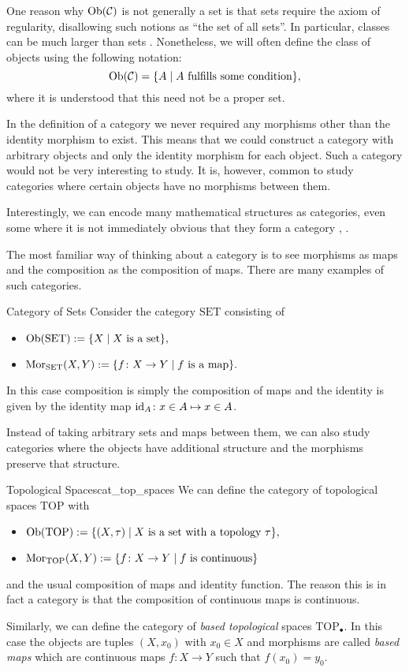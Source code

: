 One reason why $\mathrm {Ob}(\mathcal{C})$ is not generally a set is that sets require the axiom of regularity, 
disallowing such notions as ``the set of all sets''. In particular, classes can be much larger than sets \cite[p.~1]{Roman2017}.
Nonetheless, we will often define the class of objects using the following notation:
$$
\mathrm {Ob}(\mathcal{C}) = \{A \mid \text{$A$ fulfills some condition}\},
$$
where it is understood that this need not be a proper set.

In the definition of a category we never required any morphisms other than the identity morphism to exist.
This means that we could construct a category with arbitrary objects and only the identity morphism for each object. 
Such a category would not be very interesting to study.
It is, however, common to study categories where certain objects have no morphisms between them.

Interestingly, we can encode many mathematical structures as categories, even some where it is not immediately obvious that they form a category \cite[Chap.~1~Ex.~1-7]{Roman2017}, \cite[Sec.~1.1]{Leinster2014-dc}.

The most familiar way of thinking about a category is to see morphisms as maps and the composition as the composition of maps. There are many examples of such categories.

\begin{example}{Category of Sets}{}
Consider the category $\mathrm{SET}$ consisting of
\begin{itemize}
    \item $\mathrm {Ob}(\mathrm{SET}) := \{X \mid \text{$X$ is a set}\},$
    \item $\mathrm {Mor}_{\mathrm{SET}}(X,Y) := \{f\colon X \to Y \mid \text{$f$ is a map}\}.$
\end{itemize}
In this case composition is simply the composition of maps and the identity is given by the identity map $\mathrm{id}_A\colon x \in A \mapsto x \in A$.
\end{example}

Instead of taking arbitrary sets and maps between them, we can also study categories where the objects have additional structure and the morphisms preserve that structure.

\begin{example}{Topological Spaces}{cat_top_spaces}
We can define the category of topological spaces $\mathrm{TOP}$ with
\begin{itemize}
    \item $\mathrm {Ob}(\mathrm{TOP}) := \{(X,\tau) \mid \text{$X$ is a set with a topology $\tau$}\},$
    \item $\mathrm {Mor}_{\mathrm{TOP}}(X,Y) := \{f\colon X \to Y \mid \text{$f$ is continuous}\}$
\end{itemize}
and the usual composition of maps and identity function. The reason this is in fact a category is that the composition of continuous maps is continuous.
\medskip

Similarly, we can define the category of \emph{based topological} spaces $\mathrm{TOP}_\bullet$. In this case the objects are tuples $(X,x_0)$ with $x_0 \in X$ and morphisms are called \emph{based maps} which are continuous maps $f\colon X \to Y$ such that $f(x_0) = y_0$.
\end{example}

